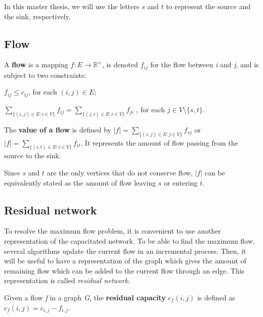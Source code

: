 In this master thesis, we will use the letters $s$ and $t$ to represent the source and the sink, respectively.

\subsection{Flow}
\begin{definition}
\label{flow}
A \textbf{flow} is a mapping $f: E \to \mathbb{R}^{+}$, is denoted $f_{ij}$ for the flow between \textit{i} and \textit{j}, and is subject to two constraints:
\indent
\begin{description}
	\label{cap_constraint}
	\item[Capacity constraint] $f_{ij} \leq c_{ij}$, for each $(i, j) \in E$;
	\label{flow_constraint}
	\item[Flow conservation constraint] $\sum\limits_{\{(i, j) \in E : i \in V\}} f_{ij} = \sum\limits_{\{(j, i) \in E : i \in V\}} f_{ji}$ , for each $j \in V \setminus \{s, t\}$.
\end{description}
\end{definition}

\begin{definition}
\label{vflow}
The \textbf{value of a flow} is defined by $\left\vert{f}\right\vert = \sum\limits_{\{(s,j) \in E : j \in V\}} f_{sj}$ or $\left\vert{f}\right\vert = \sum\limits_{\{(i,t) \in E : i \in V\}} f_{it}$. It represents the amount of flow passing from the source to the sink.
\end{definition}

Since $s$ and $t$ are the only vertices that do not conserve flow, $\left\vert{f}\right\vert$ can be equivalently stated as the amount of flow leaving $s$ or entering $t$.

\subsection{Residual network} 
To resolve the maximum flow problem, it is convenient to use another representation of the capacitated network. To be able to find the maximum flow, several algorithms update the current flow in an incremental process. Then, it will be useful to have a representation of the graph which gives the amount of remaining flow which can be added to the current flow through an edge. This representation is called \textit{residual network}.
\begin{definition}
\label{rcapacity}
Given a flow \textit{f} in a graph \textit{G}, the \textbf{residual capacity} $c_f (i,j)$ is defined as $c_f (i,j) = c_{i,j} - f_{i,j}$.
\end{definition}


